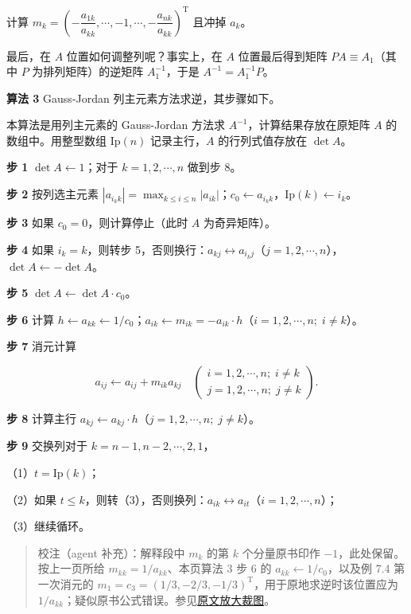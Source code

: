 \documentclass[
  10pt,
  fontset=fandol]{ctexart}
\begin{document}
计算 \(m_k=\left(-\dfrac{a_{1k}}{a_{kk}},\allowbreak \cdots,\allowbreak -1,\allowbreak \cdots,\allowbreak -\dfrac{a_{nk}}{a_{kk}}\right)^{\mathrm T}\) 且冲掉 \(a_k\)。

最后，在 \(A\) 位置如何调整列呢？事实上，在 \(A\) 位置最后得到矩阵 \(PA\equiv A_1\)（其中 \(P\) 为排列矩阵）的逆矩阵 \(A_1^{-1}\)，于是 \(A^{-1}=A_1^{-1}P\)。

\textbf{算法 3} Gauss-Jordan 列主元素方法求逆，其步骤如下。

本算法是用列主元素的 Gauss-Jordan 方法求 \(A^{-1}\)，计算结果存放在原矩阵 \(A\) 的数组中。用整型数组 \(\mathrm{Ip}(n)\) 记录主行，\(A\) 的行列式值存放在 \(\det A\)。

\textbf{步 1} \(\det A\leftarrow1\)；对于 \(k=1,2,\cdots,n\) 做到步 8。

\textbf{步 2} 按列选主元素 \(|a_{i_kk}|=\max_{k\le i\le n}|a_{ik}|\)；\(c_0\leftarrow a_{i_kk}\)，\(\mathrm{Ip}(k)\leftarrow i_k\)。

\textbf{步 3} 如果 \(c_0=0\)，则计算停止（此时 \(A\) 为奇异矩阵）。

\textbf{步 4} 如果 \(i_k=k\)，则转步 5，否则换行：\(a_{kj}\leftrightarrow a_{i_kj}\)（\(j=1,2,\cdots,n\)），\(\det A\leftarrow-\det A\)。

\textbf{步 5} \(\det A\leftarrow\det A\cdot c_0\)。

\textbf{步 6} 计算 \(h\leftarrow a_{kk}\leftarrow1/c_0\)；\(a_{ik}\leftarrow m_{ik}=-a_{ik}\cdot h\)（\(i=1,2,\cdots,n;\;i\ne k\)）。

\textbf{步 7} 消元计算

\[a_{ij}\leftarrow a_{ij}+m_{ik}a_{kj}\quad
\left(\begin{array}{l}i=1,2,\cdots,n;\;i\ne k\\j=1,2,\cdots,n;\;j\ne k\end{array}\right).\]

\textbf{步 8} 计算主行 \(a_{kj}\leftarrow a_{kj}\cdot h\)（\(j=1,2,\cdots,n;\;j\ne k\)）。

\textbf{步 9} 交换列对于 \(k=n-1,n-2,\cdots,2,1\)，

（1）\(t=\mathrm{Ip}(k)\)；

（2）如果 \(t\le k\)，则转（3），否则换列：\(a_{ik}\leftrightarrow a_{it}\)（\(i=1,2,\cdots,n\)）；

（3）继续循环。

\begin{quote}
校注（agent 补充）：解释段中 \(m_k\) 的第 \(k\) 个分量原书印作 \(-1\)，此处保留。按上一页所给 \(m_{kk}=1/a_{kk}\)、本页算法 3 步 6 的 \(a_{kk}\leftarrow1/c_0\)，以及例 7.4 第一次消元的 \(m_1=c_3=(1/3,-2/3,-1/3)^{\mathrm T}\)，用于原地求逆时该位置应为 \(1/a_{kk}\)；疑似原书公式错误。参见\href{../assets/ch07a/pdf-190-multiplier-detail.png}{原文放大裁图}。
\end{quote}
\end{document}
